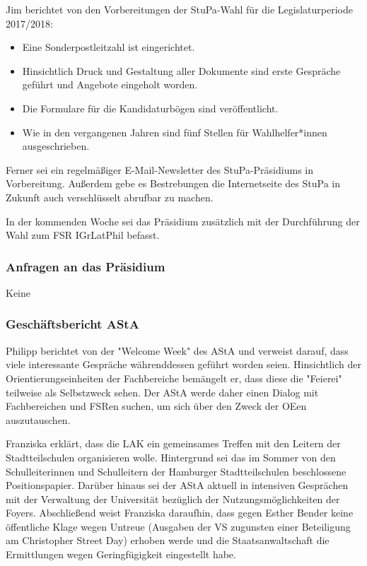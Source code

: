 \documentclass[ngerman,headheight=70pt]{scrartcl}
\begin{document}
    Jim berichtet von den Vorbereitungen der StuPa-Wahl für die Legislaturperiode
    2017/2018:

    \begin{itemize}
        \item Eine Sonderpostleitzahl ist eingerichtet.
        \item Hinsichtlich Druck und Gestaltung aller Dokumente sind erste Gespräche
              geführt und Angebote eingeholt worden.
        \item Die Formulare für die Kandidaturbögen sind veröffentlicht.
        \item Wie in den vergangenen Jahren sind fünf Stellen für Wahlhelfer*innen
              ausgeschrieben.
    \end{itemize}

    Ferner sei ein regelmäßiger E-Mail-Newsletter des StuPa-Präsidiums in
    Vorbereitung. Außerdem gebe es Bestrebungen die Internetseite des StuPa in
    Zukunft auch verschlüsselt abrufbar zu machen.

    In der kommenden Woche sei das Präsidium zusätzlich mit der Durchführung der
    Wahl zum FSR IGrLatPhil befasst.

    \subsubsection{Anfragen an das Präsidium}

    Keine

    \subsubsection{Geschäftsbericht AStA}

    Philipp berichtet von der "Welcome Week" des AStA und verweist darauf, dass
    viele interessante Gespräche währenddessen geführt worden seien. Hinsichtlich
    der Orientierungseinheiten der Fachbereiche bemängelt er, dass diese die
    "Feierei" teilweise als Selbstzweck sehen. Der AStA werde daher einen Dialog
    mit Fachbereichen und FSRen suchen, um sich über den Zweck der OEen
    auszutauschen.

    Franziska erklärt, dass die LAK ein gemeinsames Treffen mit den Leitern der
    Stadtteilschulen organisieren wolle. Hintergrund sei das im Sommer von den
    Schulleiterinnen und Schulleitern der Hamburger Stadtteilschulen beschlossene
    Positionspapier. Darüber hinaus sei der AStA aktuell in intensiven Gesprächen
    mit der Verwaltung der Universität bezüglich der Nutzungsmöglichkeiten der
    Foyers. Abschließend weist Franziska daraufhin, dass gegen Esther Bender
    keine öffentliche Klage wegen Untreue (Ausgaben der VS zugunsten einer
    Beteiligung am Christopher Street Day) erhoben werde und die Staatsanwaltschaft
    die Ermittlungen wegen Geringfügigkeit eingestellt habe.
\end{document}
